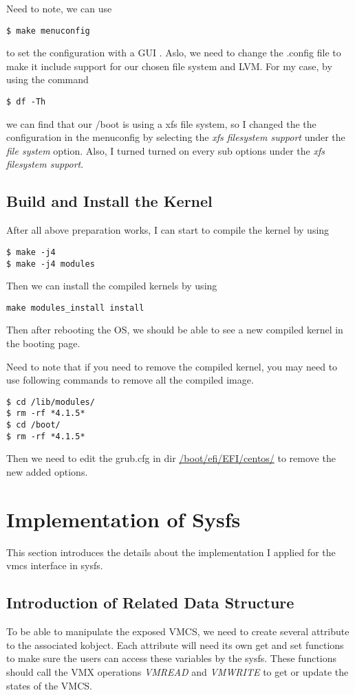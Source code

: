 \documentclass[letterpaper,10pt,onecolumn]{IEEEtran}
\begin{document}
Need to note, we can use
\begin{verbatim}
$ make menuconfig
\end{verbatim}
to set the configuration with a GUI \cite{configkernel}. Aslo, we need to change the .config file to make it include support for our chosen file system and LVM. For my case, by using the command
\begin{verbatim}
$ df -Th
\end{verbatim}
we can find that our /boot is using a xfs file system, so I changed the the configuration in the menuconfig by selecting the \emph{xfs filesystem support} under the \emph{file system} option. Also, I turned turned on every sub options under the \emph{xfs filesystem support}.
\subsection{Build and Install the Kernel}
After all above preparation works, I can start to compile the kernel \cite{firstpatch} by using
\begin{verbatim}
$ make -j4
$ make -j4 modules
\end{verbatim}
Then we can install the compiled kernels by using
\begin{verbatim}
make modules_install install
\end{verbatim}
Then after rebooting the OS, we should be able to see a new compiled kernel in the booting page.

 Need to note that if you need to remove the compiled kernel, you may need to use following commands \cite{removeKernel} to remove all the compiled image.
 \begin{verbatim}
$ cd /lib/modules/
$ rm -rf *4.1.5*
$ cd /boot/
$ rm -rf *4.1.5*
\end{verbatim}
Then we need to edit the grub.cfg in dir \url{/boot/efi/EFI/centos/} to remove the new added options.

\section{Implementation of Sysfs}
This section introduces the details about the implementation I applied for the vmcs interface in sysfs.
\subsection{Introduction of Related Data Structure}
To be able to manipulate the exposed VMCS, we need to create several attribute to the associated kobject. Each attribute will need its own get and set functions to make sure the users can access these variables by the sysfs. These functions should call the VMX operations \emph{VMREAD} and \emph{VMWRITE} to get or update the states of the VMCS.
\end{document}
